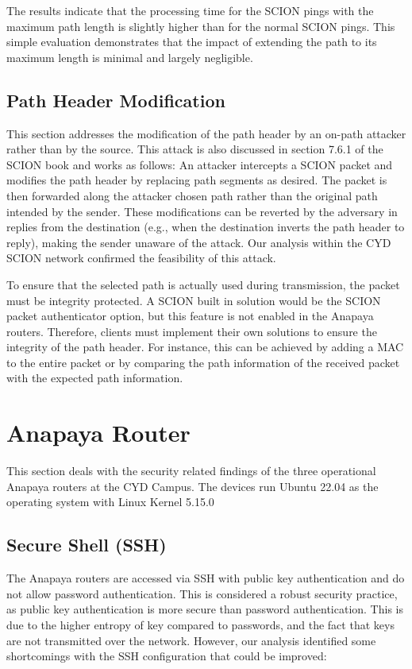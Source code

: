 The results indicate that the processing time for the SCION pings with the maximum path length is slightly higher than for the normal SCION pings.
This simple evaluation demonstrates that the impact of extending the path to its maximum length is minimal and largely negligible.


\subsection{Path Header Modification}
This section addresses the modification of the path header by an on-path attacker rather than by the source.
This attack is also discussed in section 7.6.1 of the SCION book \cite{Perrig2022} and works as follows:
An attacker intercepts a SCION packet and modifies the path header by replacing path segments as desired.
The packet is then forwarded along the attacker chosen path rather than the original path intended by the sender.
These modifications can be reverted by the adversary in replies from the destination (e.g., when the destination inverts the path header to reply), making the sender unaware of the attack.
Our analysis within the CYD SCION network confirmed the feasibility of this attack.

To ensure that the selected path is actually used during transmission, the packet must be integrity protected.
A SCION built in solution would be the SCION packet authenticator option, but this feature is not enabled in the Anapaya routers.
Therefore, clients must implement their own solutions to ensure the integrity of the path header.
For instance, this can be achieved by adding a MAC to the entire packet or by comparing the path information of the received packet with the expected path information.






\section{Anapaya Router}
This section deals with the security related findings of the three operational Anapaya routers at the CYD Campus.
The devices run Ubuntu 22.04 as the operating system with Linux Kernel 5.15.0


\subsection{Secure Shell (SSH)}
The Anapaya routers are accessed via SSH with public key authentication and do not allow password authentication.
This is considered a robust security practice, as public key authentication is more secure than password authentication.
This is due to the higher entropy of key compared to passwords, and the fact that keys are not transmitted over the network.
However, our analysis identified some shortcomings with the SSH configuration that could be improved:

